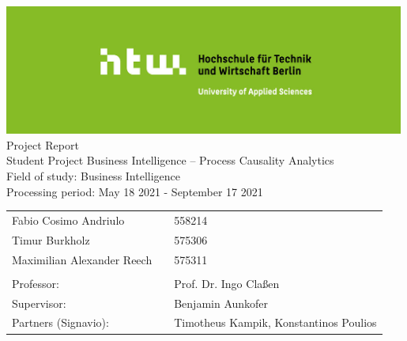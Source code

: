 \def\title{Student Project Business Intelligence – Process Causality Analytics}
\def\author{Fabio Cosimo Andriulo, Timur Burkholz, Maximilian Alexabder Reech}
\begin{titlepage}
    \begin{center}
        \includegraphics[width=0.99\textwidth]{includes/csm_Logos_1330x430_612fe2f37a.jpg}\\
        \vspace{24pt}
        \small{Project Report}\\
        \vspace{24pt}
        \huge{\title{}}\\
        \vspace{36pt}
        \small{Field of study: Business Intelligence}\\
        \small{Processing period: May 18 2021 - September 17 2021}
    \end{center}
    \begin{table}[H]
        \centering
        \begin{tabular}{lll}
            \small Fabio Cosimo Andriulo            & \hspace{96pt} & \small 558214\\
            \small Timur Burkholz                   & \hspace{96pt} & \small 575306\\
            \small Maximilian Alexander Reech       & \hspace{96pt} & \small 575311\\
            \\
            \small Professor:                       & \hspace{96pt} & \small Prof. Dr. Ingo Claßen\\
            \small Supervisor:                      & \hspace{96pt} & \small Benjamin Aunkofer\\
            \small Partners (Signavio):             & \hspace{96pt} & \small Timotheus Kampik, Konstantinos Poulios\\
        \end{tabular}
    \end{table}
\end{titlepage}
\clearpage

